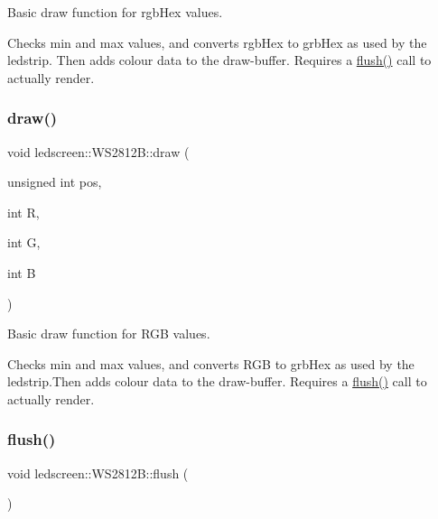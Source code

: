 Basic draw function for rgb\+Hex values. 

Checks min and max values, and converts rgb\+Hex to grb\+Hex as used by the ledstrip. Then adds colour data to the draw-\/buffer. Requires a \hyperlink{classledscreen_1_1WS2812B_ad30d0950ef865d72ebe2a0b0fe1399e2}{flush()} call to actually render. \mbox{\label{classledscreen_1_1WS2812B_a500df20b730204ccc9ab7a79bbf6b5d4}} 
\subsubsection{\texorpdfstring{draw()}{draw()}\hspace{0.1cm}{\footnotesize\ttfamily [2/2]}}
{\footnotesize\ttfamily void ledscreen\+::\+W\+S2812\+B\+::draw (\begin{DoxyParamCaption}\item[{unsigned int}]{pos,  }\item[{int}]{R,  }\item[{int}]{G,  }\item[{int}]{B }\end{DoxyParamCaption})\hspace{0.3cm}{\ttfamily [inline]}}



Basic draw function for R\+GB values. 

Checks min and max values, and converts R\+GB to grb\+Hex as used by the ledstrip.\+Then adds colour data to the draw-\/buffer. Requires a \hyperlink{classledscreen_1_1WS2812B_ad30d0950ef865d72ebe2a0b0fe1399e2}{flush()} call to actually render. \mbox{\label{classledscreen_1_1WS2812B_ad30d0950ef865d72ebe2a0b0fe1399e2}} 
\subsubsection{\texorpdfstring{flush()}{flush()}}
{\footnotesize\ttfamily void ledscreen\+::\+W\+S2812\+B\+::flush (\begin{DoxyParamCaption}{ }\end{DoxyParamCaption})\hspace{0.3cm}{\ttfamily [inline]}}



